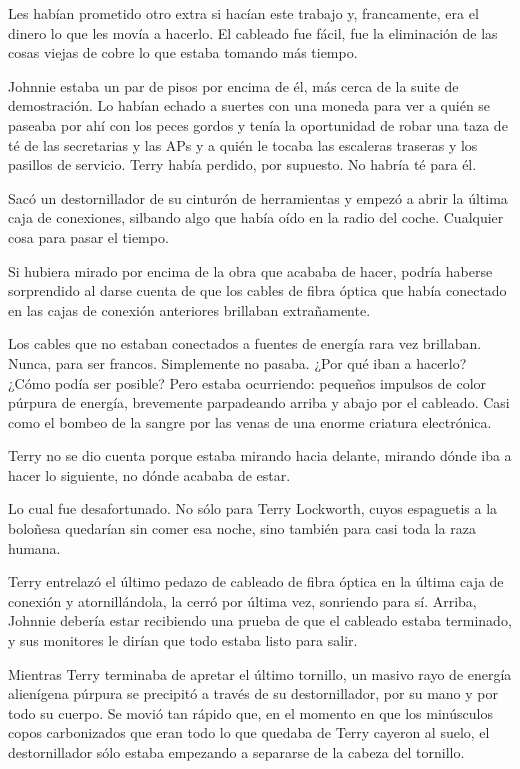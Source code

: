 Les habían prometido otro extra si hacían este trabajo y, francamente,
era el dinero lo que les movía a hacerlo. El cableado fue fácil, fue la
eliminación de las cosas viejas de cobre lo que estaba tomando más
tiempo.

Johnnie estaba un par de pisos por encima de él, más cerca de la suite
de demostración. Lo habían echado a suertes con una moneda para ver a
quién se paseaba por ahí con los peces gordos y tenía la oportunidad de
robar una taza de té de las secretarias y las APs y a quién le tocaba
las escaleras traseras y los pasillos de servicio. Terry había perdido,
por supuesto. No habría té para él.

Sacó un destornillador de su cinturón de herramientas y empezó a abrir
la última caja de conexiones, silbando algo que había oído en la radio
del coche. Cualquier cosa para pasar el tiempo.

Si hubiera mirado por encima de la obra que acababa de hacer, podría
haberse sorprendido al darse cuenta de que los cables de fibra óptica
que había conectado en las cajas de conexión anteriores brillaban
extrañamente.

Los cables que no estaban conectados a fuentes de energía rara vez
brillaban. Nunca, para ser francos. Simplemente no pasaba. ¿Por qué iban
a hacerlo? ¿Cómo podía ser posible? Pero estaba ocurriendo: pequeños
impulsos de color púrpura de energía, brevemente parpadeando arriba y
abajo por el cableado. Casi como el bombeo de la sangre por las venas de
una enorme criatura electrónica.

Terry no se dio cuenta porque estaba mirando hacia delante, mirando
dónde iba a hacer lo siguiente, no dónde acababa de estar.

Lo cual fue desafortunado. No sólo para Terry Lockworth, cuyos
espaguetis a la boloñesa quedarían sin comer esa noche, sino también
para casi toda la raza humana.

Terry entrelazó el último pedazo de cableado de fibra óptica en la
última caja de conexión y atornillándola, la cerró por última vez,
sonriendo para sí. Arriba, Johnnie debería estar recibiendo una prueba
de que el cableado estaba terminado, y sus monitores le dirían que todo
estaba listo para salir.

Mientras Terry terminaba de apretar el último tornillo, un masivo rayo
de energía alienígena púrpura se precipitó a través de su
destornillador, por su mano y por todo su cuerpo. Se movió tan rápido
que, en el momento en que los minúsculos copos carbonizados que eran
todo lo que quedaba de Terry cayeron al suelo, el destornillador sólo
estaba empezando a separarse de la cabeza del tornillo.

